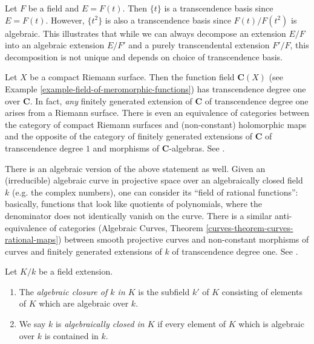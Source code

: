\begin{example}
\label{example-function-field-not-unique-transcendence-basis}
Let $F$ be a field and $E = F(t)$. Then $\{t\}$ is a
transcendence basis since $E = F(t)$. However, $\{t^2\}$
is also a transcendence basis since $F(t)/F(t^2)$ is algebraic.
This illustrates that while we can always decompose an extension
$E/F$ into an algebraic extension $E/F'$ and a
purely transcendental extension $F'/F$, this decomposition is not unique and
depends on choice of transcendence basis.
\end{example}

\begin{example}
\label{example-riemann-surface-transcendence}
Let $X$ be a compact Riemann surface. Then the function field
$\mathbf{C}(X)$ (see Example \ref{example-field-of-meromorphic-functions})
has transcendence degree one over $\mathbf{C}$. In fact, {\it any}
finitely generated extension of $\mathbf{C}$ of transcendence degree
one arises from a Riemann surface. There is even an equivalence of
categories between the category of compact Riemann surfaces and
(non-constant) holomorphic maps and the opposite of the category of finitely
generated extensions of $\mathbf{C}$ of transcendence degree $1$
and morphisms of $\mathbf{C}$-algebras. See \cite{Forster}.

\medskip\noindent
There is an algebraic version of the above statement as well. Given an
(irreducible) algebraic curve in projective space over an algebraically
closed field $k$ (e.g. the complex numbers), one can consider its
``field of rational functions'': basically, functions that look like
quotients of polynomials, where the denominator does not identically
vanish on the curve. There is a similar anti-equivalence of categories
(Algebraic Curves, Theorem \ref{curves-theorem-curves-rational-maps})
between smooth projective curves and
non-constant morphisms of curves and finitely generated extensions of $k$ of
transcendence degree one. See \cite{H}.
\end{example}

\begin{definition}
\label{definition-algebraically-closed-in}
Let $K/k$ be a field extension.
\begin{enumerate}
\item The {\it algebraic closure of $k$ in $K$} is the subfield
$k'$ of $K$ consisting of elements of $K$ which are algebraic over $k$.
\item We say $k$ is {\it algebraically closed in $K$} if
every element of $K$ which is algebraic over $k$ is
contained in $k$.
\end{enumerate}
\end{definition}

